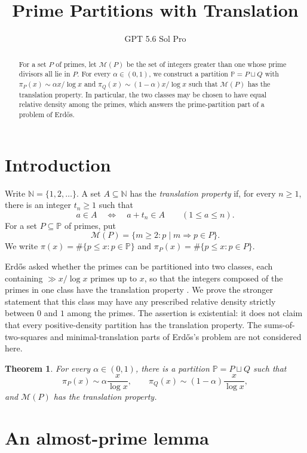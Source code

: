 \documentclass[a4paper,11pt]{amsart}
\title{Prime Partitions with Translation}
\author{GPT 5.6 Sol Pro}
\date{}
\newtheorem{theorem}{Theorem}
\newcommand{\PP}{\mathbb P}
\newcommand{\NN}{\mathbb N}
\newcommand{\cM}{\mathcal M}
\begin{document}
\begin{abstract}
For a set \(P\) of primes, let \(\mathcal M(P)\) be the set of integers greater than one whose prime divisors all lie in \(P\).
For every \(\alpha\in(0,1)\), we construct a partition \(\mathbb P=P\sqcup Q\) with
\(\pi_P(x)\sim \alpha x/\log x\) and
\(\pi_Q(x)\sim(1-\alpha)x/\log x\) such that \(\mathcal M(P)\) has the translation property.
In particular, the two classes may be chosen to have equal relative density among the primes, which answers the prime-partition part of a problem of Erdős.
\end{abstract}

\maketitle

\section{Introduction}

Write \(\NN=\{1,2,\ldots\}\).
A set \(A\subseteq\NN\) has the \emph{translation property} if, for every \(n\geq 1\), there is an integer \(t_n\geq 1\) such that
\[
a\in A \quad\Longleftrightarrow\quad a+t_n\in A
\qquad (1\leq a\leq n).
\]
For a set \(P\subseteq\PP\) of primes, put
\[
\cM(P)=\{m\geq 2:p\mid m\Longrightarrow p\in P\}.
\]
We write
\(\pi(x)=\#\{p\leq x:p\in\PP\}\) and
\(\pi_P(x)=\#\{p\leq x:p\in P\}\).

Erdős asked whether the primes can be partitioned into two classes, each containing \(\gg x/\log x\) primes up to \(x\), so that the integers composed of the primes in one class have the translation property \cite{Erdos}.
We prove the stronger statement that this class may have any prescribed relative density strictly between \(0\) and \(1\) among the primes.
The assertion is existential: it does not claim that every positive-density partition has the translation property.
The sums-of-two-squares and minimal-translation parts of Erdős's problem are not considered here.

\begin{theorem}\label{thm:main}
For every \(\alpha\in(0,1)\), there is a partition
\(\PP=P\sqcup Q\) such that
\[
\pi_P(x)\sim \alpha\frac{x}{\log x},
\qquad
\pi_Q(x)\sim (1-\alpha)\frac{x}{\log x},
\]
and \(\cM(P)\) has the translation property.
\end{theorem}

\section{An almost-prime lemma}
\end{document}
